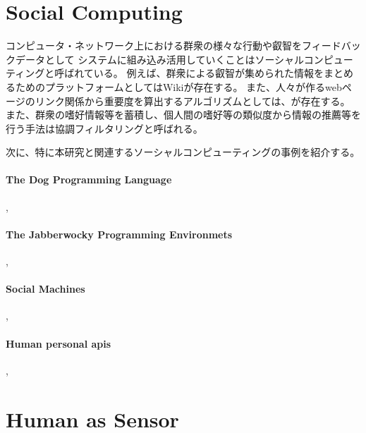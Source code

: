 \section{Social Computing}\label{social-computing}

コンピュータ・ネットワーク上における群衆の様々な行動や叡智をフィードバックデータとして
システムに組み込み活用していくことはソーシャルコンピューティングと呼ばれている。
例えば、群衆による叡智が集められた情報をまとめるためのプラットフォームとしてはWiki\cite{wiki}が存在する。
また、人々が作るwebページのリンク関係から重要度を算出するアルゴリズムとしては、\cite{pagerank}が存在する。
また、群衆の嗜好情報等を蓄積し、個人間の嗜好等の類似度から情報の推薦等を行う手法は協調フィルタリングと呼ばれる\cite{collaborative-filtering}。

次に、特に本研究と関連するソーシャルコンピューティングの事例を紹介する。

\paragraph{The Dog Programming
Language}\label{the-dog-programming-language}

\mbox{}

\cite{dog},

\paragraph{The Jabberwocky Programming
Environmets}\label{the-jabberwocky-programming-environmets}

\mbox{}

\cite{jabberwocky},

\paragraph{Social Machines}\label{social-machines}

\mbox{}

\cite{social-machines},

\paragraph{Human personal apis}\label{human-personal-apis}

\mbox{}

\cite{personal-api},

\section{Human as Sensor}\label{human-as-sensor}

